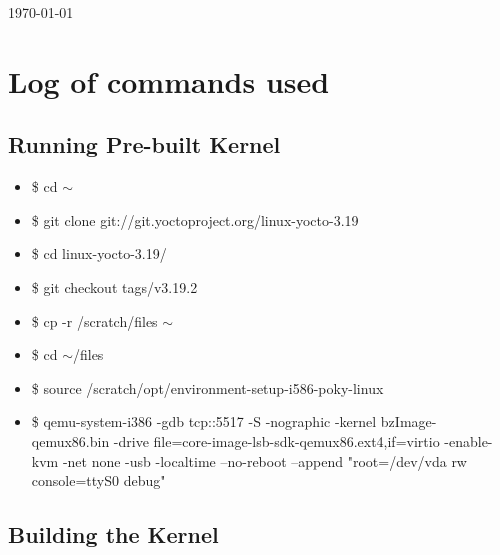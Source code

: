 \documentclass[10pt,a4paper,english]{article}
\begin{document}
\begin{titlepage}
{\large \today}\\[3cm] %




\vfill %



\end{titlepage}

\tableofcontents
\newpage

\section{Log of commands used}
\label{sec:introduction}

\subsection{Running Pre-built Kernel}

\begin{itemize}
\item \$ cd $\sim$
\item \$ git clone git://git.yoctoproject.org/linux-yocto-3.19
\item \$ cd linux-yocto-3.19/
\item \$ git checkout tags/v3.19.2
\item \$ cp -r /scratch/files $\sim$
\item \$ cd $\sim$/files
\item\$  source /scratch/opt/environment-setup-i586-poky-linux
\item \$ qemu-system-i386 -gdb tcp::5517 -S -nographic -kernel bzImage-qemux86.bin -drive file=core-image-lsb-sdk-qemux86.ext4,if=virtio -enable-kvm -net none -usb -localtime --no-reboot --append "root=/dev/vda rw console=ttyS0 debug"
\end{itemize}

\subsection{Building the Kernel}
\end{document}
